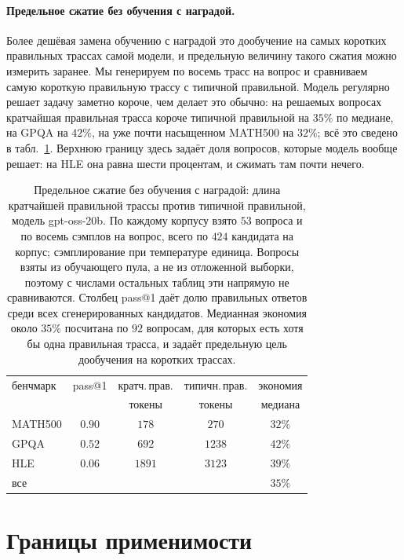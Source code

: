 \documentclass[11pt]{article}
\begin{document}
\paragraph{Предельное сжатие без обучения с наградой.} Более дешёвая замена обучению с наградой это дообучение на самых коротких правильных трассах самой модели, и предельную величину такого сжатия можно измерить заранее. Мы генерируем по восемь трасс на вопрос и сравниваем самую короткую правильную трассу с типичной правильной. Модель регулярно решает задачу заметно короче, чем делает это обычно: на решаемых вопросах кратчайшая правильная трасса короче типичной правильной на $35\%$ по медиане, на GPQA на $42\%$, на уже почти насыщенном MATH500 на $32\%$; всё это сведено в табл.~\ref{tab:sft}. Верхнюю границу здесь задаёт доля вопросов, которые модель вообще решает: на HLE она равна шести процентам, и сжимать там почти нечего.

\begin{table}[t]
\centering
\begin{tabular}{lcccc}
\toprule
бенчмарк & pass@1 & кратч.\,прав. & типичн.\,прав. & экономия \\
 & & токены & токены & медиана \\
\midrule
MATH500 & $0.90$ & $178$  & $270$  & $32\%$ \\
GPQA    & $0.52$ & $692$  & $1238$ & $42\%$ \\
HLE     & $0.06$ & $1891$ & $3123$ & $39\%$ \\
\midrule
все     &        &        &        & $35\%$ \\
\bottomrule
\end{tabular}
\caption{Предельное сжатие без обучения с наградой: длина кратчайшей правильной трассы против типичной правильной, модель gpt-oss-20b. По каждому корпусу взято $53$ вопроса и по восемь сэмплов на вопрос, всего по $424$ кандидата на корпус; сэмплирование при температуре единица. Вопросы взяты из обучающего пула, а не из отложенной выборки, поэтому с числами остальных таблиц эти напрямую не сравниваются. Столбец pass@1 даёт долю правильных ответов среди всех сгенерированных кандидатов. Медианная экономия около $35\%$ посчитана по $92$ вопросам, для которых есть хотя бы одна правильная трасса, и задаёт предельную цель дообучения на коротких трассах.}
\label{tab:sft}
\end{table}

\section{Границы применимости}
\label{sec:limits-scope}
\end{document}
